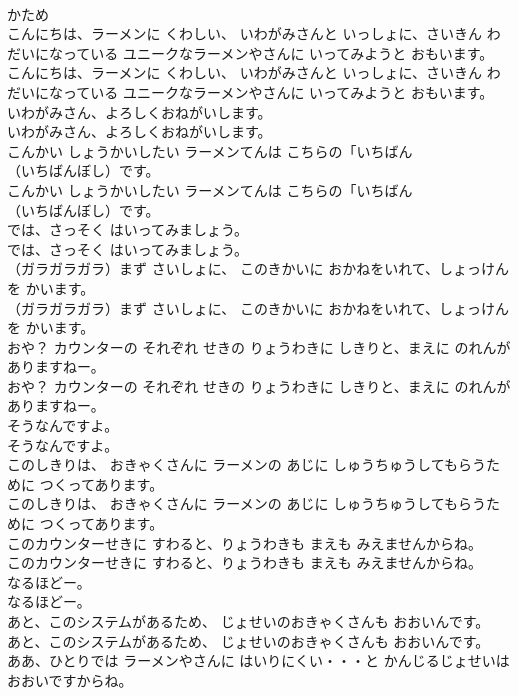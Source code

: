 \documentclass[8pt]{extreport}
\begin{document}
\begin{CJK}{UTF8}{min}
\\	かため
\\	こんにちは、ラーメンに くわしい、 いわがみさんと いっしょに、さいきん わだいになっている ユニークなラーメンやさんに いってみようと おもいます。	
\\	こんにちは、ラーメンに くわしい、 いわがみさんと いっしょに、さいきん わだいになっている ユニークなラーメンやさんに いってみようと おもいます。 
\\	いわがみさん、よろしくおねがいします。	
\\	いわがみさん、よろしくおねがいします。 
\\	こんかい しょうかいしたい ラーメンてんは こちらの「いちばん
\\	（いちばんぼし）です。	
\\	こんかい しょうかいしたい ラーメンてんは こちらの「いちばん
\\	（いちばんぼし）です。 
\\	では、さっそく はいってみましょう。	
\\	では、さっそく はいってみましょう。 
\\	（ガラガラガラ）まず さいしょに、 このきかいに おかねをいれて、しょっけんを かいます。	
\\	（ガラガラガラ）まず さいしょに、 このきかいに おかねをいれて、しょっけんを かいます。 
\\	おや？ カウンターの それぞれ せきの りょうわきに しきりと、まえに のれんが ありますねー。	
\\	おや？ カウンターの それぞれ せきの りょうわきに しきりと、まえに のれんが ありますねー。 
\\	そうなんですよ。	
\\	そうなんですよ。 
\\	このしきりは、 おきゃくさんに ラーメンの あじに しゅうちゅうしてもらうために つくってあります。	
\\	このしきりは、 おきゃくさんに ラーメンの あじに しゅうちゅうしてもらうために つくってあります。 
\\	このカウンターせきに すわると、りょうわきも まえも みえませんからね。	
\\	このカウンターせきに すわると、りょうわきも まえも みえませんからね。 
\\	なるほどー。	
\\	なるほどー。 
\\	あと、このシステムがあるため、 じょせいのおきゃくさんも おおいんです。	
\\	あと、このシステムがあるため、 じょせいのおきゃくさんも おおいんです。 
\\	ああ、ひとりでは ラーメンやさんに はいりにくい・・・と かんじるじょせいは おおいですからね。	

\end{CJK}
\end{document}
